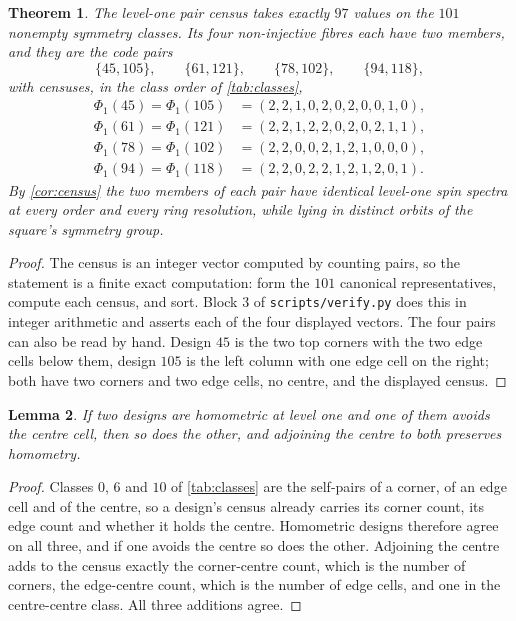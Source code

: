 \documentclass[11pt]{amsart}
\newtheorem{theorem}{Theorem}[section]
\newtheorem{lemma}[theorem]{Lemma}
\theoremstyle{definition}
\theoremstyle{remark}
\begin{document}
\begin{theorem}
\label{thm:homometric}
The level-one pair census takes exactly $97$ values on the $101$ nonempty symmetry classes. Its four non-injective fibres each have two members, and they are the code pairs
\[
\{45, 105\}, \qquad \{61, 121\}, \qquad \{78, 102\}, \qquad \{94, 118\} ,
\]
with censuses, in the class order of \cref{tab:classes},
\[
\begin{aligned}
\Phi_1(45) = \Phi_1(105) &= (2,2,1,0,2,0,2,0,0,1,0), \\
\Phi_1(61) = \Phi_1(121) &= (2,2,1,2,2,0,2,0,2,1,1), \\
\Phi_1(78) = \Phi_1(102) &= (2,2,0,0,2,1,2,1,0,0,0), \\
\Phi_1(94) = \Phi_1(118) &= (2,2,0,2,2,1,2,1,2,0,1).
\end{aligned}
\]
By \cref{cor:census} the two members of each pair have identical level-one spin spectra at every order and every ring resolution, while lying in distinct orbits of the square's symmetry group.
\end{theorem}

\begin{proof}
The census is an integer vector computed by counting pairs, so the statement is a finite exact computation: form the $101$ canonical representatives, compute each census, and sort. Block 3 of \texttt{scripts/verify.py} does this in integer arithmetic and asserts each of the four displayed vectors. The four pairs can also be read by hand. Design $45$ is the two top corners with the two edge cells below them, design $105$ is the left column with one edge cell on the right; both have two corners and two edge cells, no centre, and the displayed census.
\end{proof}

\begin{lemma}
\label{lem:centre}
If two designs are homometric at level one and one of them avoids the centre cell, then so does the other, and adjoining the centre to both preserves homometry.
\end{lemma}

\begin{proof}
Classes $0$, $6$ and $10$ of \cref{tab:classes} are the self-pairs of a corner, of an edge cell and of the centre, so a design's census already carries its corner count, its edge count and whether it holds the centre. Homometric designs therefore agree on all three, and if one avoids the centre so does the other. Adjoining the centre adds to the census exactly the corner-centre count, which is the number of corners, the edge-centre count, which is the number of edge cells, and one in the centre-centre class. All three additions agree.
\end{proof}
\end{document}
